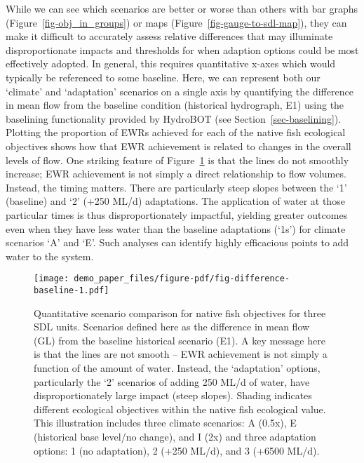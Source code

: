 \documentclass[
  number]{elsarticle}
\begin{document}
While we can see which scenarios are better or worse than others with
bar graphs (Figure~\ref{fig-obj_in_groups}) or maps
(Figure~\ref{fig-gauge-to-sdl-map}), they can make it difficult to
accurately assess relative differences that may illuminate
disproportionate impacts and thresholds for when adaption options could
be most effectively adopted. In general, this requires quantitative
x-axes which would typically be referenced to some baseline. Here, we
can represent both our `climate' and `adaptation' scenarios on a single
axis by quantifying the difference in mean flow from the baseline
condition (historical hydrograph, E1) using the baselining functionality
provided by HydroBOT (see Section~\ref{sec-baselining}). Plotting the
proportion of EWRs achieved for each of the native fish ecological
objectives shows how that EWR achievement is related to changes in the
overall levels of flow. One striking feature of
Figure~\ref{fig-difference-baseline} is that the lines do not smoothly
increase; EWR achievement is not simply a direct relationship to flow
volumes. Instead, the timing matters. There are particularly steep
slopes between the `1' (baseline) and `2' (+250 ML/d) adaptations. The
application of water at those particular times is thus
disproportionately impactful, yielding greater outcomes even when they
have less water than the baseline adaptations (`1s') for climate
scenarios `A' and `E'. Such analyses can identify highly efficacious
points to add water to the system.

\begin{figure}

{\centering \texttt{[image: demo\_paper\_files/figure-pdf/fig-difference-baseline-1.pdf]}

}

\caption{\label{fig-difference-baseline}Quantitative scenario comparison
for native fish objectives for three SDL units. Scenarios defined here
as the difference in mean flow (GL) from the baseline historical
scenario (E1). A key message here is that the lines are not smooth --
EWR achievement is not simply a function of the amount of water.
Instead, the `adaptation' options, particularly the `2' scenarios of
adding 250 ML/d of water, have disproportionately large impact (steep
slopes). Shading indicates different ecological objectives within the
native fish ecological value. This illustration includes three climate
scenarios: A (0.5x), E (historical base level/no change), and I (2x) and
three adaptation options: 1 (no adaptation), 2 (+250 ML/d), and 3 (+6500
ML/d).}

\end{figure}
\end{document}
